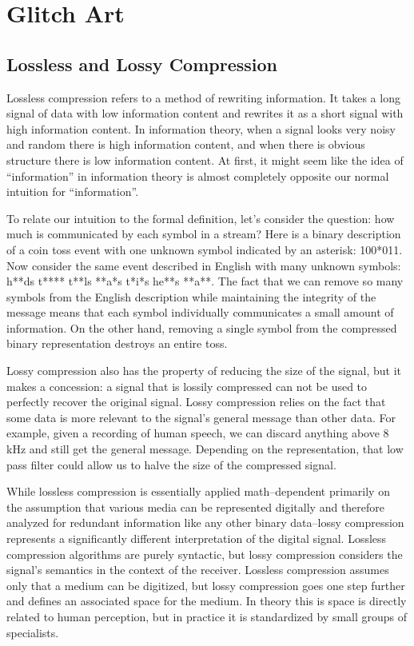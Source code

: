 \documentclass{thesis}
\begin{document}
\chapter{Glitch Art}

\section{Lossless and Lossy Compression}
	Lossless compression refers to a method of rewriting information. It takes a long signal of data with low information content and rewrites it as a short signal with high information content. In information theory, when a signal looks very noisy and random there is high information content, and when there is obvious structure there is low information content. At first, it might seem like the idea of ``information'' in information theory is almost completely opposite our normal intuition for ``information''.
	
	To relate our intuition to the formal definition, let's consider the question: how much is communicated by each symbol in a stream? Here is a binary description of a coin toss event with one unknown symbol indicated by an asterisk: 100*011. Now consider the same event described in English with many unknown symbols: h**ds t**** t**ls **a*s t*i*s he**s **a**. The fact that we can remove so many symbols from the English description while maintaining the integrity of the message means that each symbol individually communicates a small amount of information. On the other hand, removing a single symbol from the compressed binary representation destroys an entire toss.
	
	Lossy compression also has the property of reducing the size of the signal, but it makes a concession: a signal that is lossily compressed can not be used to perfectly recover the original signal. Lossy compression relies on the fact that some data is more relevant to the signal's general message than other data. For example, given a recording of human speech, we can discard anything above 8 kHz and still get the general message. Depending on the representation, that low pass filter could allow us to halve the size of the compressed signal.
	
	While lossless compression is essentially applied math--dependent primarily on the assumption that various media can be represented digitally and therefore analyzed for redundant information like any other binary data--lossy compression represents a significantly different interpretation of the digital signal. Lossless compression algorithms are purely syntactic, but lossy compression considers the signal's semantics in the context of the receiver. Lossless compression assumes only that a medium can be digitized, but lossy compression goes one step further and defines an associated space for the medium. In theory this is space is directly related to human perception, but in practice it is standardized by small groups of specialists.
	
\end{document}
